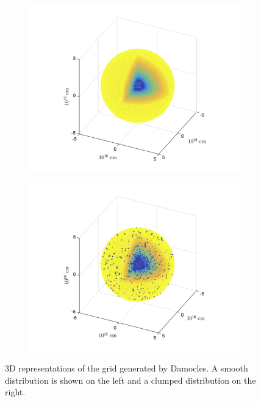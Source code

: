 	

	\begin{figure}
		\begin{subfigure}{0.4\textwidth}
		\includegraphics[scale=0.5, trim=35mm 5mm 34mm 5mm,clip=true]{chapters/chapter2/smooth_grid}
		\end{subfigure}
		\hspace{18mm}
		\begin{subfigure}{0.4\textwidth}
		\includegraphics[scale=0.5, trim=35mm 5mm 34mm 5mm,clip=true]{chapters/chapter2/clumped_grid}
		\end{subfigure}
		\caption{3D representations of the grid generated by Damocles.  A smooth distribution is shown on the left and a clumped distribution on the right.}
		\label{fig:grid}
	\end{figure}


